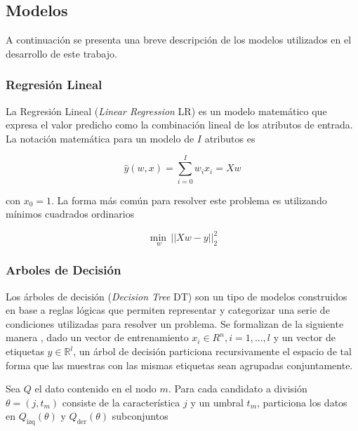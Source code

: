 \documentclass[spanish]{article}
\begin{document}
        \subsection{Modelos}
        
            A continuación se presenta una breve descripción de los modelos utilizados en el desarrollo de este trabajo.
        
            \subsubsection{Regresión Lineal}
            
                La Regresión Lineal (\emph{Linear Regression} LR) es un modelo matemático que expresa el valor predicho como 
                la combinación lineal de los atributos de entrada. La notación matemática para un modelo de $I$ atributos es
            
                \begin{equation}
                    \hat{y}(w, x) = \sum_{i=0}^{I} w_i x_i = Xw
                \end{equation}
                
                con $x_0=1$. La forma más común para resolver este problema es utilizando mínimos cuadrados ordinarios
                
                \begin{equation}
                    \underset{w}{\min\,} {|| X w - y||_2^2}
                \end{equation}
            
            \subsubsection{Arboles de Decisión}
            
                Los árboles de decisión (\emph{Decision Tree} DT) son un tipo de modelos construidos en base a reglas lógicas que
                permiten representar y categorizar una serie de condiciones utilizadas para resolver un problema. Se formalizan
                de la siguiente manera , dado un vector de entrenamiento 
                $x_i \in R^n, i=1, ..., l$ y un vector de etiquetas $y \in \mathbb{R}^l$, un árbol de decisión
                particiona recursivamente el espacio de tal forma que las muestras con las mismas etiquetas sean agrupadas conjuntamente.
    
                Sea $Q$ el dato contenido en el nodo $m$. Para cada candidato a división $\theta = (j, t_m)$ consiste de la característica
                $j$ y un umbral $t_m$, particiona los datos en $Q_{\text{izq}}(\theta)$  y $Q_{\text{der}}(\theta)$ subconjuntos
                
\end{document}
